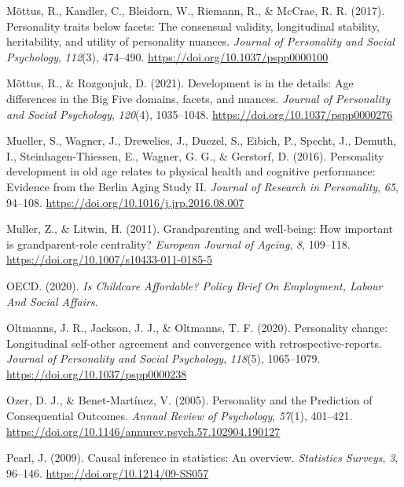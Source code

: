\documentclass[
  english,
  man, noextraspace]{apa7}
\begin{document}
\leavevmode\hypertarget{ref-mottusPersonalityTraitsFacets2017}{}%
Mõttus, R., Kandler, C., Bleidorn, W., Riemann, R., \& McCrae, R. R. (2017). Personality traits below facets: The consensual validity, longitudinal stability, heritability, and utility of personality nuances. \emph{Journal of Personality and Social Psychology}, \emph{112}(3), 474--490. \url{https://doi.org/10.1037/pspp0000100}

\leavevmode\hypertarget{ref-mottusDevelopmentDetailsAge2021}{}%
Mõttus, R., \& Rozgonjuk, D. (2021). Development is in the details: Age differences in the Big Five domains, facets, and nuances. \emph{Journal of Personality and Social Psychology}, \emph{120}(4), 1035--1048. \url{https://doi.org/10.1037/pspp0000276}

\leavevmode\hypertarget{ref-muellerPersonalityDevelopmentOld2016}{}%
Mueller, S., Wagner, J., Drewelies, J., Duezel, S., Eibich, P., Specht, J., Demuth, I., Steinhagen-Thiessen, E., Wagner, G. G., \& Gerstorf, D. (2016). Personality development in old age relates to physical health and cognitive performance: Evidence from the Berlin Aging Study II. \emph{Journal of Research in Personality}, \emph{65}, 94--108. \url{https://doi.org/10.1016/j.jrp.2016.08.007}

\leavevmode\hypertarget{ref-mullerGrandparentingWellbeingHow2011}{}%
Muller, Z., \& Litwin, H. (2011). Grandparenting and well-being: How important is grandparent-role centrality? \emph{European Journal of Ageing}, \emph{8}, 109--118. \url{https://doi.org/10.1007/s10433-011-0185-5}

\leavevmode\hypertarget{ref-oecdChildcareAffordablePolicy2020}{}%
OECD. (2020). \emph{Is Childcare Affordable? Policy Brief On Employment, Labour And Social Affairs}.

\leavevmode\hypertarget{ref-oltmannsPersonalityChangeLongitudinal2020}{}%
Oltmanns, J. R., Jackson, J. J., \& Oltmanns, T. F. (2020). Personality change: Longitudinal self-other agreement and convergence with retrospective-reports. \emph{Journal of Personality and Social Psychology}, \emph{118}(5), 1065--1079. \url{https://doi.org/10.1037/pspp0000238}

\leavevmode\hypertarget{ref-ozerPersonalityPredictionConsequential2005}{}%
Ozer, D. J., \& Benet-Martínez, V. (2005). Personality and the Prediction of Consequential Outcomes. \emph{Annual Review of Psychology}, \emph{57}(1), 401--421. \url{https://doi.org/10.1146/annurev.psych.57.102904.190127}

\leavevmode\hypertarget{ref-pearlCausalInferenceStatistics2009}{}%
Pearl, J. (2009). Causal inference in statistics: An overview. \emph{Statistics Surveys}, \emph{3}, 96--146. \url{https://doi.org/10.1214/09-SS057}
\end{document}
